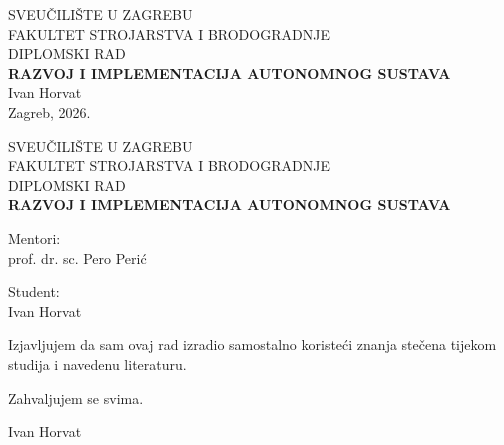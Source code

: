 \documentclass[12pt,a4paper]{article}
\begin{document}
\begin{titlepage}
    \centering
    {\large SVEUČILIŠTE U ZAGREBU\\}
    {\large FAKULTET STROJARSTVA I BRODOGRADNJE\\}
    \vspace{2.5cm}
    {\Large DIPLOMSKI RAD\\}
    \vspace{1.5cm}
    {\Huge \textbf{RAZVOJ I IMPLEMENTACIJA AUTONOMNOG SUSTAVA}\\}
    \vspace{1.5cm}
    {\large Ivan Horvat\\}
    \vfill
    {\large Zagreb, 2026.}
\end{titlepage}

\begin{titlepage}
    \thispagestyle{empty}
    \centering
    {\large SVEUČILIŠTE U ZAGREBU\\}
    {\large FAKULTET STROJARSTVA I BRODOGRADNJE\\}
    \vspace{2.5cm}
    {\Large DIPLOMSKI RAD\\}
    \vspace{1.25cm}
    {\Large \textbf{RAZVOJ I IMPLEMENTACIJA AUTONOMNOG SUSTAVA}\\}
    \vspace{1.5cm}
    
    \begin{minipage}[t]{0.45\textwidth}
        \begin{flushleft}
            \large Mentori:\\
            prof. dr. sc. Pero Perić
        \end{flushleft}
    \end{minipage}
    \hfill
    \begin{minipage}[t]{0.45\textwidth}
        \begin{flushright}
            \large Student:\\
            Ivan Horvat
        \end{flushright}
    \end{minipage}

    \vfill
    \begin{minipage}{0.9\textwidth}
    \noindent Izjavljujem da sam ovaj rad izradio samostalno koristeći znanja stečena tijekom studija i navedenu literaturu.
    \end{minipage}

    \vspace{1.5cm}

    \begin{minipage}{0.9\textwidth}
    \noindent Zahvaljujem se svima.
    \end{minipage}

    \vspace{2cm}
    {\large Ivan Horvat}
\end{titlepage}
\end{document}
